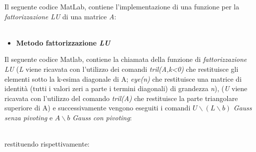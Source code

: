 Il seguente codice MatLab, contiene l'implementazione di una funzione per la \textit{fattorizzazione LU} di una matrice \textit{A}:\\\
\begin{itemize}
	\item \textbf{Metodo fattorizzazione \textit{LU}}	
		
\end{itemize}
Il seguente codice Matlab, contiene la chiamata della funzione di \textit{fattorizzazione LU} (\textit{L} viene ricavata con l'utilizzo dei comandi \textit{tril(A,k<0)} che restituisce gli elementi sotto la k-esima diagonale di A; \textit{eye(n)} che restituisce una matrice di identità (tutti i valori zeri a parte i termini diagonali) di grandezza \textit{n}), (\textit{U} viene ricavata con l'utilizzo del comando \textit{tril(A)} che restituisce la parte triangolare superiore di A) e successivamente vengono eseguiti i comandi $U \backslash (L \backslash b)$ \textit{Gauss senza pivoting} e $A \backslash b$ \textit{Gauss con pivoting}:\\\
	
restituendo rispettivamente:\\\

